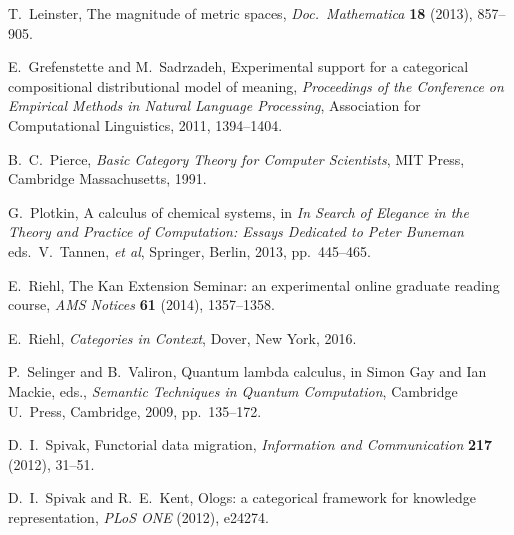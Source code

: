 \documentclass[12pt]{amsart}
\begin{document}
\begin{thebibliography}{10}
 T.\ Leinster, The magnitude of metric spaces, \textsl{Doc.\ Mathematica} \textbf{18} (2013), 857--905.  %

 E.\ Grefenstette and M.\ Sadrzadeh, Experimental support for a categorical compositional distributional model of meaning, \textsl{Proceedings of the Conference on Empirical Methods in Natural Language Processing}, Association for Computational Linguistics, 2011, 1394--1404.   %

 B.\ C.\ Pierce, \textsl{Basic Category Theory for Computer Scientists}, MIT Press, Cambridge Massachusetts, 1991.


 G.\ Plotkin, A calculus of chemical systems, in \textsl{In Search of Elegance in the Theory and Practice of Computation: Essays Dedicated to Peter Buneman} eds.\ V.\ Tannen, 
\textit{et al}, Springer, Berlin, 2013, pp.\ 445--465.  %

 E.\ Riehl, The Kan Extension Seminar: an experimental online graduate reading course, \textsl{AMS Notices} \textbf{61} (2014), 1357--1358.  %

 E.\ Riehl, \textsl{Categories in Context},  Dover, New York, 2016.  %

 P.\ Selinger and B.\ Valiron, Quantum lambda calculus, 
in Simon Gay and Ian Mackie, eds., \textsl{Semantic Techniques in Quantum Computation}, Cambridge U.\ Press, Cambridge, 2009, pp.\ 135--172.  %

 D.\ I.\ Spivak, Functorial data migration, \textsl{Information and Communication} \textbf{217} (2012), 31--51.   %

  D.\ I.\ Spivak and R.\ E.\ Kent, Ologs: a categorical framework for knowledge representation, \textsl{PLoS ONE} (2012), e24274.    %


\end{thebibliography}
\end{document}
